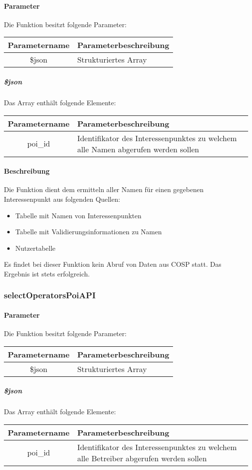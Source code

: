 \paragraph{Parameter} Die Funktion besitzt folgende Parameter:
\begin{table}[H]
	\begin{tabular}{|c|p{11cm}|}
		\hline
		\textbf{Parametername} & \textbf{Parameterbeschreibung} \\ \hline
		\$json & Strukturiertes Array \\ \hline
	\end{tabular}
\end{table}
\subparagraph{\$json}Das Array enthält folgende Elemente:
\begin{table}[H]
	\begin{tabular}{|c|p{11cm}|}
		\hline
		\textbf{Parametername} & \textbf{Parameterbeschreibung} \\ \hline
		poi\_id & Identifikator des Interessenpunktes zu welchem alle Namen abgerufen werden sollen \\ \hline
	\end{tabular}
\end{table}
\paragraph{Beschreibung} Die Funktion dient dem ermitteln aller Namen für einen gegebenen Interessenpunkt aus folgenden Quellen:
\begin{itemize}
	\item Tabelle mit Namen von Interessenpunkten
	\item Tabelle mit Validierungsinformationen zu Namen
	\item Nutzertabelle
\end{itemize}
Es findet bei dieser Funktion kein Abruf von Daten aus {\glqq COSP\grqq} statt. Das Ergebnis ist stets erfolgreich.
\subsubsection{selectOperatorsPoiAPI}
\paragraph{Parameter} Die Funktion besitzt folgende Parameter:
\begin{table}[H]
	\begin{tabular}{|c|p{11cm}|}
		\hline
		\textbf{Parametername} & \textbf{Parameterbeschreibung} \\ \hline
		\$json & Strukturiertes Array \\ \hline
	\end{tabular}
\end{table}
\subparagraph{\$json}Das Array enthält folgende Elemente:
\begin{table}[H]
	\begin{tabular}{|c|p{11cm}|}
		\hline
		\textbf{Parametername} & \textbf{Parameterbeschreibung} \\ \hline
		poi\_id & Identifikator des Interessenpunktes zu welchem alle Betreiber abgerufen werden sollen \\ \hline
	\end{tabular}
\end{table}
